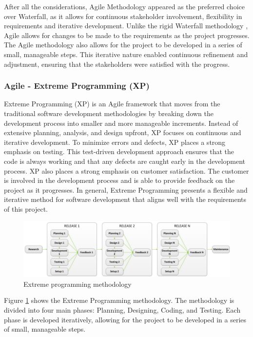 After all the considerations, Agile Methodology \cite{despa2014comparative} appeared as the preferred choice over Waterfall, as it allows for continuous stakeholder involvement, flexibility in requirements and iterative development.
Unlike the rigid Waterfall methodology \cite{despa2014comparative}, Agile allows for changes to be made to the requirements as the project progresses. The Agile methodology also allows for the project to be developed in a series of small, manageable steps.
This iterative nature enabled continuous refinement and adjustment, ensuring that the stakeholders were satisfied with the progress.

\subsubsection*{Agile - Extreme Programming (XP)}
Extreme Programming (XP) is an Agile framework that moves from the traditional software development methodologies by breaking down the development process into smaller and more manageable increments.
Instead of extensive planning, analysis, and design upfront, XP focuses on continuous and iterative development. To minimize errors and defects, XP places a strong emphasis on testing.
This test-driven development approach ensures that the code is always working and that any defects are caught early in the development process.
XP also places a strong emphasis on customer satisfaction. The customer is involved in the development process and is able to provide feedback on the project as it progresses. \cite{despa2014comparative} 
In general, Extreme Programming presents a flexible and iterative method for software development that aligns well with the requirements of this project.

\begin{figure}
    \centering
    \includegraphics[width=1.0\linewidth]{images/xp.png}
    \caption{Extreme programming methodology \cite{despa2014comparative}}
    \label{fig:agile}
\end{figure}

Figure \ref{fig:agile} shows the Extreme Programming methodology. The methodology is divided into four main phases: Planning, Designing, Coding, and Testing. 
Each phase is developed iteratively, allowing for the project to be developed in a series of small, manageable steps. 

